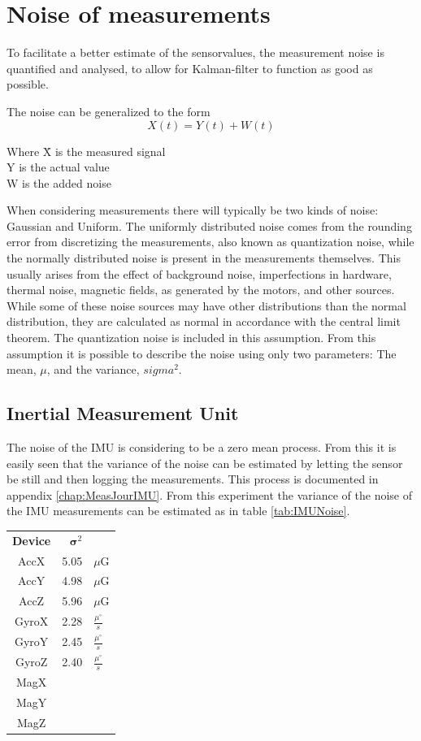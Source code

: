 \chapter{Noise of measurements}
\label{ch:noise}
To facilitate a better estimate of the sensorvalues, the measurement noise is quantified and analysed, to allow for Kalman-filter to function as good as possible.

The noise can be generalized to the form
\begin{equation}
X(t) = Y(t) + W(t)
\end{equation}
\begin{tabbing}
Where \= X is the measured signal\\
	\> Y is the actual value\\
	\> W is the added noise 
\end{tabbing}
When considering measurements there will typically be two kinds of noise: Gaussian and Uniform. The uniformly distributed noise comes from the rounding error from discretizing the measurements, also known as quantization noise, while the normally distributed noise is present in the measurements themselves. This usually arises from the effect of background noise, imperfections in hardware, thermal noise, magnetic fields, as generated by the motors, and other sources. While some of these noise sources may have other distributions than the normal distribution, they are calculated as normal in accordance with the central limit theorem. The quantization noise is included in this assumption. From this assumption it is possible to describe the noise using only two parameters: The mean, $\mu$, and the variance, $sigma^{2}$.

\section{Inertial Measurement Unit}
The noise of the IMU is considering to be a zero mean process. From this it is easily seen that the variance of the noise can be estimated by letting the sensor be still and then logging the measurements. This process is documented in appendix \ref{chap:MeasJourIMU}. From this experiment the variance of the noise of the IMU measurements can be estimated as in table \ref{tab:IMUNoise}.

\begin{table}
\begin{tabular}{c|r l}
\textbf{Device} & $\boldsymbol\sigma ^2$ &\\
AccX & 5.05 & $\mu$G \\
AccY & 4.98 & $\mu$G \\
AccZ & 5.96 & $\mu$G \\
GyroX & 2.28 & $\frac{\mu ^\circ}{s}$\\
GyroY & 2.45 & $\frac{\mu ^\circ}{s}$\\
GyroZ & 2.40 & $\frac{\mu ^\circ}{s}$\\
MagX & & \\
MagY & & \\
MagZ & &\\
\end{tabular}
\end{table}
\label{tab:IMUNoise}

